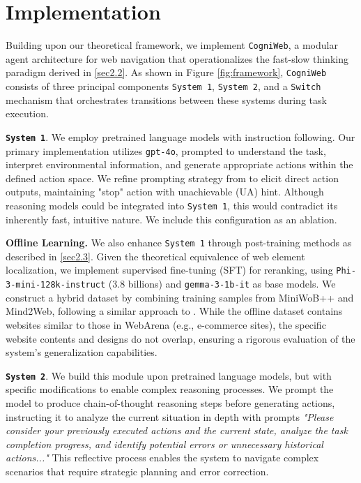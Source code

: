 \documentclass{article}
\begin{document}
\section{Implementation}
Building upon our theoretical framework, we implement \texttt{CogniWeb}, a modular agent architecture for web navigation that operationalizes the fast-slow thinking paradigm derived in \ref{sec2.2}. As shown in Figure \ref{fig:framework}, \texttt{CogniWeb} consists of three principal components \texttt{System 1}, \texttt{System 2}, and a \texttt{Switch} mechanism that orchestrates transitions between these systems during task execution. 

\textbf{\texttt{System 1}}. We employ pretrained language models with instruction following. Our primary implementation utilizes \texttt{gpt-4o}, prompted to understand the task, interpret environmental information, and generate appropriate actions within the defined action space. We refine prompting strategy from \citet{zhou2023webarena} to elicit direct action outputs, maintaining "stop" action with unachievable (UA) hint. Although reasoning models could be integrated into \texttt{System 1}, this would contradict its inherently fast, intuitive nature. We include this configuration as an ablation.

\textbf{Offline Learning.} We also enhance \texttt{System 1} through post-training methods as described in \ref{sec2.3}. Given the theoretical equivalence of web element localization, we implement supervised fine-tuning (SFT) for reranking, using \texttt{Phi-3-mini-128k-instruct} (3.8 billions) and \texttt{gemma-3-1b-it} as base models. We construct a hybrid dataset by combining training samples from MiniWoB++ and Mind2Web, following a similar approach to \citet{lai2024autowebglm}. While the offline dataset contains websites similar to those in WebArena (e.g., e-commerce sites), the specific website contents and designs do not overlap, ensuring a rigorous evaluation of the system's generalization capabilities.

\textbf{\texttt{System 2}}. We build this module upon pretrained language models, but with specific modifications to enable complex reasoning processes. We prompt the model to produce chain-of-thought reasoning steps before generating actions, instructing it to analyze the current situation in depth with prompts \textit{"Please consider your previously executed actions and the current state, analyze the task completion progress, and identify potential errors or unnecessary historical actions..."} This reflective process enables the system to navigate complex scenarios that require strategic planning and error correction.
\end{document}
